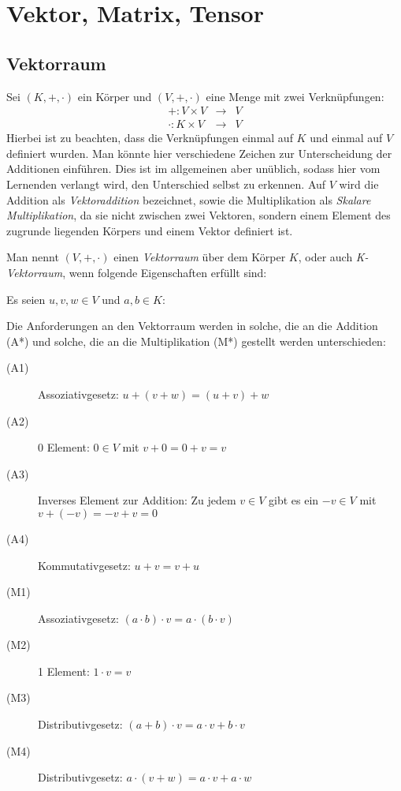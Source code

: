 
\chapter{Vektor, Matrix, Tensor}



\section{Vektorraum}\label{vectorspace}

Sei $(K,+,\cdot )$ ein Körper und $(V,+ ,\cdot)$ eine Menge mit zwei Verknüpfungen:
\begin{eqnarray*}
+ : V\times V &\longrightarrow& V \\
\cdot : K \times V &\longrightarrow& V 
\end{eqnarray*}
Hierbei ist zu beachten, dass die Verknüpfungen einmal auf $K$ und einmal auf $V$ definiert wurden. Man könnte hier verschiedene Zeichen zur Unterscheidung der Additionen einführen. Dies ist im allgemeinen aber unüblich, sodass hier vom Lernenden verlangt wird, den Unterschied selbst zu erkennen. Auf $V$ wird die Addition als \emph{Vektoraddition} bezeichnet, sowie die Multiplikation als \emph{Skalare Multiplikation}, da sie nicht zwischen zwei Vektoren, sondern einem Element des zugrunde liegenden Körpers und einem Vektor definiert ist. 

Man nennt $(V,+ ,\cdot)$ einen \emph{Vektorraum} über dem Körper $K$, oder auch \emph{K-Vektorraum}, wenn folgende Eigenschaften erfüllt sind:

\noindent Es seien $u,v,w \in V$ und $a,b \in K$:

Die Anforderungen an den Vektorraum werden in solche, die an die Addition (A*) und solche, die an die Multiplikation (M*) gestellt werden unterschieden:

\begin{description}
\item[(A1)] Assoziativgesetz: $u+(v+w) = (u+v)+w$
\item[(A2)] $0$ Element: $0\in V$ mit $v+0=0+v=v$
\item[(A3)] Inverses Element zur Addition: Zu jedem $v\in V$ gibt es ein $-v\in V$ mit $v+(-v) = -v+v = 0$
\item[(A4)] Kommutativgesetz: $u+v = v+u$
\end{description}

\begin{description}
\item[(M1)] Assoziativgesetz: $(a \cdot b)\cdot v = a\cdot (b\cdot v)$
\item[(M2)] 1 Element: $1\cdot v = v$
\item[(M3)] Distributivgesetz: $(a+b)\cdot v = a\cdot v + b\cdot v$
\item[(M4)] Distributivgesetz: $a\cdot(v+w) = a\cdot v + a\cdot w$
\end{description}

